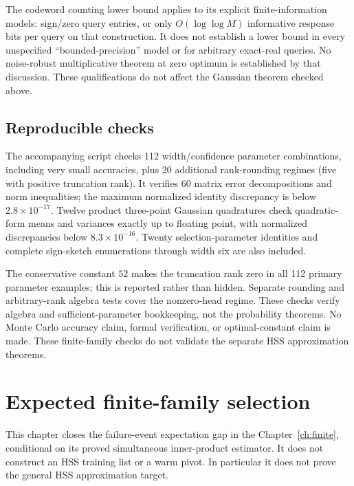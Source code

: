 \documentclass[11pt,oneside,openany,a4paper]{book}
\numberwithin{equation}{chapter}
\theoremstyle{definition}
\theoremstyle{remark}
\newcommand{\R}{\mathbb R}\newcommand{\E}{\mathbb E}\newcommand{\Prb}{\mathbb P}\newcommand{\PP}{\mathbb P}
\newcommand{\F}[1]{\left\lVert#1\right\rVert_F}
\begin{document}
The codeword counting lower bound applies to its explicit finite-information models: sign/zero query entries, or only $O(\log\log M)$ informative response bits per query on that construction. It does not establish a lower bound in every unspecified ``bounded-precision'' model or for arbitrary exact-real queries. No noise-robust multiplicative theorem at zero optimum is established by that discussion. These qualifications do not affect the Gaussian theorem checked above.

\section{Reproducible checks}
The accompanying script checks 112 width/confidence parameter combinations, including very small accuracies, plus 20 additional rank-rounding regimes (five with positive truncation rank). It verifies 60 matrix error decompositions and norm inequalities; the maximum normalized identity discrepancy is below $2.8\times10^{-17}$. Twelve product three-point Gaussian quadratures check quadratic-form means and variances exactly up to floating point, with normalized discrepancies below $8.3\times10^{-16}$. Twenty selection-parameter identities and complete sign-sketch enumerations through width six are also included.

The conservative constant $52$ makes the truncation rank zero in all 112 primary parameter examples; this is reported rather than hidden. Separate rounding and arbitrary-rank algebra tests cover the nonzero-head regime. These checks verify algebra and sufficient-parameter bookkeeping, not the probability theorems. No Monte Carlo accuracy claim, formal verification, or optimal-constant claim is made. These finite-family checks do not validate the separate HSS approximation theorems.

\endgroup

\begingroup
\let\E\relax
\newcommand{\E}{\mathbb E}
\let\Prb\relax
\newcommand{\Prb}{\mathbb P}
\let\R\relax
\newcommand{\R}{\mathbb R}
\let\F\relax
\newcommand{\F}[1]{\lVert#1\rVert_F}
\let\argmin\relax
\newcommand{\argmin}{\operatorname*{arg\,min}}
\chapter{Expected finite-family selection}\label{ch:expected}
This chapter closes the failure-event expectation gap in the
Chapter~\ref{ch:finite}, conditional on its proved
simultaneous inner-product estimator. It does not construct an HSS
training list or a warm pivot. In particular it does not prove the
general HSS approximation target.
\end{document}
